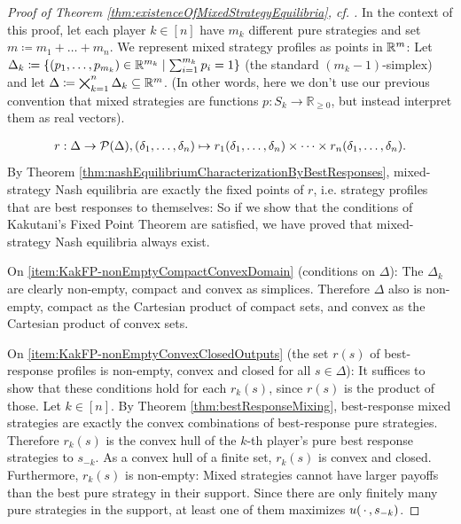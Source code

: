 \documentclass[a4paper]{scrreprt}
\newcommand{\Rp}{\mathbb{R}_{\geq 0}}
\theoremstyle{definition}
\begin{document}
    \begin{proof}[Proof of Theorem \ref{thm:existenceOfMixedStrategyEquilibria}, cf. {\cite[p.29]{bib:fudenbergGameTheory}}]
        In the context of this proof, let each player $k \in [n]$ have $m_k$ different pure strategies and set $m \coloneqq m_1 + \dots + m_n$.
        We represent mixed strategy profiles as points in $\mathbb{R}^m$: Let $\Delta_k \coloneqq \{(p_1, \dots, p_{m_k}) \in \mathbb{R}^{m_k} \mid \sum_{i=1}^{m_k} p_i = 1\}$ (the standard $(m_k - 1)$-simplex) and let $\Delta \coloneqq \bigtimes_{k=1}^n \Delta_k \subseteq \mathbb{R}^m$. (In other words, here we don't use our previous convention that mixed strategies are functions $p: S_k \to \Rp$, but instead interpret them as real vectors).
        
        \begin{gather}
            r: \Delta \to \operatorname{\mathcal{P}}(\Delta), (\delta_1, \dots, \delta_n) \mapsto r_1(\delta_1, \dots, \delta_n) \times \dots \times r_n(\delta_1, \dots, \delta_n).
            \label{eq:bestResponseCorresponenceDefinition}
        \end{gather}
        By Theorem \ref{thm:nashEquilibriumCharacterizationByBestResponses}, mixed-strategy Nash equilibria are exactly the fixed points of $r$, i.e. strategy profiles that are best responses to themselves: So if we show that the conditions of Kakutani's Fixed Point Theorem are satisfied, we have proved that mixed-strategy Nash equilibria always exist.
        
        On \ref{item:KakFP-nonEmptyCompactConvexDomain} (conditions on $\Delta$): The $\Delta_k$ are clearly non-empty, compact and convex as simplices. Therefore $\Delta$ also is non-empty,
        compact as the Cartesian product of compact sets, and convex as the Cartesian product of convex sets. %
        
        On \ref{item:KakFP-nonEmptyConvexClosedOutputs} (the set $r(s)$ of best-response profiles is non-empty, convex and closed for all $s \in \Delta$): It suffices to show that these conditions hold for each $r_k(s)$, since $r(s)$ is the product of those. Let $k \in [n]$. By Theorem \ref{thm:bestResponseMixing}, best-response mixed strategies are exactly the convex combinations of best-response pure strategies. Therefore $r_k(s)$ is the convex hull of the $k$-th player's pure best response strategies to $s_{-k}$. As a convex hull of a finite set, $r_k(s)$ is convex and closed.
        Furthermore, $r_k(s)$ is non-empty: Mixed strategies cannot have larger payoffs than the best pure strategy in their support. Since there are only finitely many pure strategies in the support, at least one of them maximizes $u(\,\cdot\,, s_{-k})$.
        

\end{proof}
\end{document}
